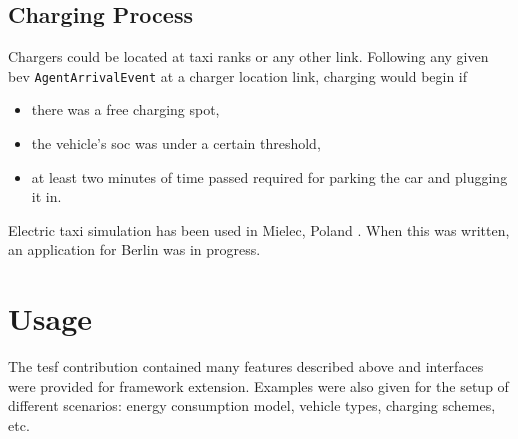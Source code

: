 \subsection{Charging Process}
Chargers could be located at taxi ranks or any other link. 
Following any given \gls{bev} \lstinline$AgentArrivalEvent$ at a charger location link, charging would begin if
%
\begin{itemize}\styleItemize
	\item there was a free charging spot,
	\item the vehicle's \gls{soc} was under a certain threshold,
	\item at least two minutes of time passed required for parking the car and plugging it in.
\end{itemize}

Electric taxi simulation has been used in Mielec, Poland \citep[][]{Bischoff2013MaTaxis, BischoffMaciejewskiEcabMielecMobilTUM}. When this was written, an application for Berlin was in progress.

\section{Usage}
The \gls{tesf} \gls{contribution} contained many features described above and interfaces were provided for framework extension. 
Examples were also given for the setup of different scenarios: \eg energy consumption model, vehicle types, charging schemes, etc.


